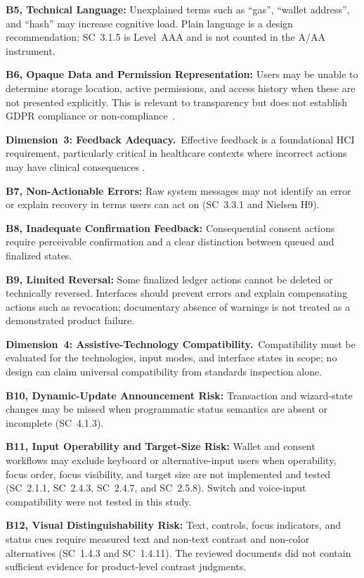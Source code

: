 \documentclass[journal]{IEEEtran}
\begin{document}
\textbf{B5, Technical Language:} Unexplained terms such as ``gas'', ``wallet address'', and ``hash'' may increase cognitive load. Plain language is a design recommendation; SC~3.1.5 is Level~AAA and is not counted in the A/AA instrument.

\textbf{B6, Opaque Data and Permission Representation:} Users may be unable to determine storage location, active permissions, and access history when these are not presented explicitly. This is relevant to transparency but does not establish GDPR compliance or non-compliance~\cite{gdpr2016}.

\noindent\textbf{Dimension~3: Feedback Adequacy.}\ Effective feedback is a foundational HCI requirement, particularly critical in healthcare contexts where incorrect actions may have clinical consequences \cite{tharani2022ui}.

\textbf{B7, Non-Actionable Errors:} Raw system messages may not identify an error or explain recovery in terms users can act on (SC~3.3.1 and Nielsen H9).

\textbf{B8, Inadequate Confirmation Feedback:} Consequential consent actions require perceivable confirmation and a clear distinction between queued and finalized states.

\textbf{B9, Limited Reversal:} Some finalized ledger actions cannot be deleted or technically reversed. Interfaces should prevent errors and explain compensating actions such as revocation; documentary absence of warnings is not treated as a demonstrated product failure.

\noindent\textbf{Dimension~4: Assistive-Technology Compatibility.}\ Compatibility must be evaluated for the technologies, input modes, and interface states in scope; no design can claim universal compatibility from standards inspection alone.

\textbf{B10, Dynamic-Update Announcement Risk:} Transaction and wizard-state changes may be missed when programmatic status semantics are absent or incomplete (SC~4.1.3).

\textbf{B11, Input Operability and Target-Size Risk:} Wallet and consent workflows may exclude keyboard or alternative-input users when operability, focus order, focus visibility, and target size are not implemented and tested (SC~2.1.1, SC~2.4.3, SC~2.4.7, and SC~2.5.8). Switch and voice-input compatibility were not tested in this study.

\textbf{B12, Visual Distinguishability Risk:} Text, controls, focus indicators, and status cues require measured text and non-text contrast and non-color alternatives (SC~1.4.3 and SC~1.4.11). The reviewed documents did not contain sufficient evidence for product-level contrast judgments.
\end{document}
